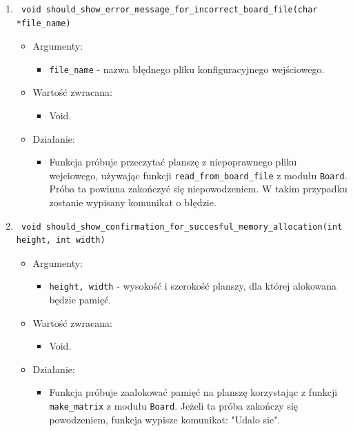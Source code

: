 \documentclass[a4paper,11pt, notitlepage ]{article}
\begin{document}
\begin{enumerate}
\item \begin{verbatim} void should_show_error_message_for_incorrect_board_file(char *file_name) \end{verbatim}
\begin{itemize}
\item Argumenty:
\begin{itemize}
\item \verb+file_name+ - nazwa błędnego pliku konfiguracyjnego wejściowego.
\end{itemize}
\item Wartość zwracana:
\begin{itemize}
\item Void.
\end{itemize}
\item Działanie:
\begin{itemize}
\item Funkcja próbuje przeczytać planszę z niepoprawnego pliku wejciowego, używając funkcji \verb+read_from_board_file+ z modułu \verb+Board+. Próba ta powinna zakończyć się niepowodzeniem. W takim przypadku zostanie wypisany komunikat o błędzie.
\end{itemize}
\end{itemize}


\item \begin{verbatim} void should_show_confirmation_for_succesful_memory_allocation(int height, int width) \end{verbatim}
\begin{itemize}
\item Argumenty:
\begin{itemize}
\item \verb+height, width+ - wysokość i szerokość planszy, dla której alokowana będzie pamięć.
\end{itemize}
\item Wartość zwracana:
\begin{itemize}
\item Void.
\end{itemize}
\item Działanie:
\begin{itemize}
\item Funkcja próbuje zaalokować pamięć na planszę korzystając z funkcji \verb+make_matrix+ z modułu \verb+Board+. Jeżeli ta próba zakończy się powodzeniem, funkcja wypisze komunikat: "Udalo sie".
\end{itemize}
\end{itemize}


\end{enumerate}
\end{document}
